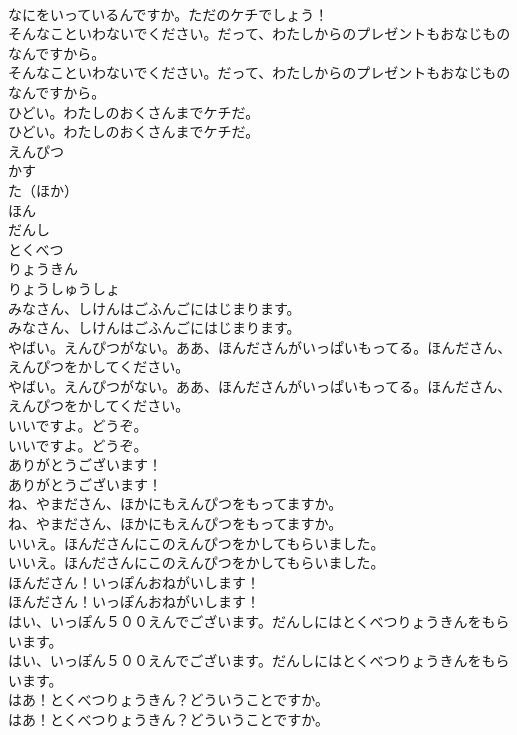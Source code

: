 \documentclass[8pt]{extreport}
\begin{document}
\begin{CJK}{UTF8}{min}
\\	なにをいっているんですか。ただのケチでしょう！ 
\\	そんなこといわないでください。だって、わたしからのプレゼントもおなじものなんですから。	
\\	そんなこといわないでください。だって、わたしからのプレゼントもおなじものなんですから。 
\\	ひどい。わたしのおくさんまでケチだ。	
\\	ひどい。わたしのおくさんまでケチだ。 
\\	えんぴつ
\\	かす
\\	た（ほか）
\\	ほん
\\	だんし
\\	とくべつ
\\	りょうきん
\\	りょうしゅうしょ
\\	みなさん、しけんはごふんごにはじまります。	
\\	みなさん、しけんはごふんごにはじまります。 
\\	やばい。えんぴつがない。ああ、ほんださんがいっぱいもってる。ほんださん、えんぴつをかしてください。	
\\	やばい。えんぴつがない。ああ、ほんださんがいっぱいもってる。ほんださん、えんぴつをかしてください。 
\\	いいですよ。どうぞ。	
\\	いいですよ。どうぞ。 
\\	ありがとうございます！	
\\	ありがとうございます！ 
\\	ね、やまださん、ほかにもえんぴつをもってますか。	
\\	ね、やまださん、ほかにもえんぴつをもってますか。 
\\	いいえ。ほんださんにこのえんぴつをかしてもらいました。	
\\	いいえ。ほんださんにこのえんぴつをかしてもらいました。 
\\	ほんださん！いっぽんおねがいします！	
\\	ほんださん！いっぽんおねがいします！ 
\\	はい、いっぽん５００えんでございます。だんしにはとくべつりょうきんをもらいます。	
\\	はい、いっぽん５００えんでございます。だんしにはとくべつりょうきんをもらいます。 
\\	はあ！とくべつりょうきん？どういうことですか。	
\\	はあ！とくべつりょうきん？どういうことですか。 

\end{CJK}
\end{document}

